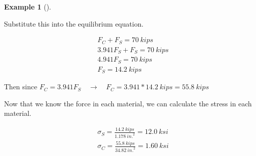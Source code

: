 \documentclass[
  letterpaper,
  DIV=11,
  numbers=noendperiod]{scrreprt}
\theoremstyle{definition}
\newtheorem{example}{Example}[chapter]
\theoremstyle{remark}
\begin{document}
\begin{tcolorbox}
\begin{example}[]
\begin{tcolorbox}
Substitute this into the equilibrium equation.

\[
\begin{aligned}
&F_C+F_S=70{~kips} \\
&3.941 F_S+F_S=70{~kips} \\
&4.941 F_S=70{~kips} \\
&F_S=14.2{~kips}
\end{aligned}
\]

Then since
\(F_C=3.941 F_S \quad\rightarrow\quad F_C=3.941 * 14.2{~kips}=55.8{~kips}\)

Now that we know the force in each material, we can calculate the stress
in each material.

\[
\begin{aligned}
& \sigma_S=\frac{14.2{~kips}}{1.178{~in.}^2}=12.0{~ksi} \\
& \sigma_C=\frac{55.8{~kips}}{34.82{~in.}^2}=1.60{~ksi}
\end{aligned}
\]

\end{tcolorbox}

\end{example}

\end{tcolorbox}
\end{document}
